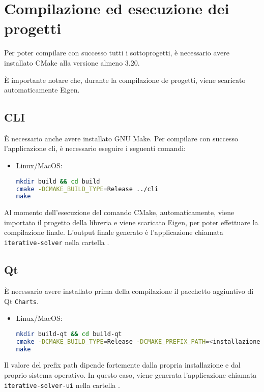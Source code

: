	\appendix
\section{Compilazione ed esecuzione dei progetti}
Per poter compilare con successo tutti i sottoprogetti, è necessario avere installato CMake alla versione almeno 3.20.

È importante notare che, durante la compilazione de progetti, viene scaricato automaticamente Eigen.

\subsection{CLI}
È necessario anche avere installato GNU Make.
Per compilare con successo l'applicazione cli, è necessario eseguire i seguenti comandi:
\begin{itemize}
	\item Linux/MacOS: 
	\begin{lstlisting}[language=Bash]
mkdir build && cd build
cmake -DCMAKE_BUILD_TYPE=Release ../cli
make \end{lstlisting}
\end{itemize}


Al momento dell'esecuzione del comando CMake, automaticamente, viene importato il progetto della libreria e viene scaricato Eigen, per poter effettuare la compilazione finale. L'output finale generato è l'applicazione chiamata \texttt{iterative-solver} nella cartella .

\subsection{Qt}
È necessario avere installato prima della compilazione il pacchetto aggiuntivo di Qt \texttt{Charts}.
\begin{itemize}
	\item Linux/MacOS: 
	\begin{lstlisting}[language=Bash]
mkdir build-qt && cd build-qt
cmake -DCMAKE_BUILD_TYPE=Release -DCMAKE_PREFIX_PATH=<installazione di Qt>/<versione>/<sistema> ../QTInterface
make \end{lstlisting}
\end{itemize}
Il valore del prefix path dipende fortemente dalla propria installazione e dal proprio sistema operativo. In questo caso, viene generata l'applicazione chiamata \texttt{iterative-solver-ui} nella cartella .